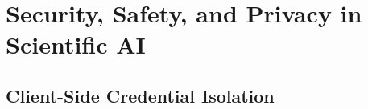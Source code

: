 \section{Security, Safety, and Privacy in Scientific AI}
\label{sec:security_safety}

\subsection{Client-Side Credential Isolation}
